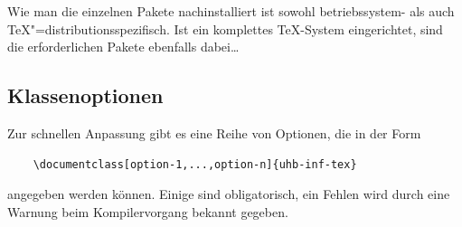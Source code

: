 \documentclass[nicefonts,nogruppe,nosemester,noveranstaltung,notutor,noabgabe,utf]{uhb-inf-tex}
\begin{document}
Wie man die einzelnen Pakete nachinstalliert ist sowohl betriebssystem- als auch \TeX"=distributionsspezifisch. Ist ein komplettes \TeX-System eingerichtet, sind die erforderlichen Pakete ebenfalls dabei\dots

\subsection{Klassenoptionen}

Zur schnellen Anpassung gibt es eine Reihe von Optionen, die in der Form

\begin{verbatim}
    \documentclass[option-1,...,option-n]{uhb-inf-tex}
\end{verbatim}

angegeben werden können. Einige sind obligatorisch, ein Fehlen wird durch eine Warnung beim Kompilervorgang bekannt gegeben.
\end{document}
